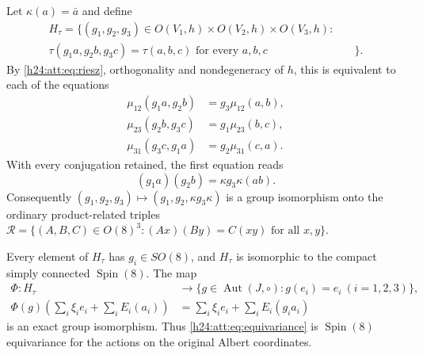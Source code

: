 Let $\kappa(a)=\bar a$ and define
\begin{equation}
\begin{split}
H_\tau=\{(g_1,g_2,g_3)\in O(V_1,h)\times O(V_2,h)\times O(V_3,h):\quad&\\
\tau(g_1a,g_2b,g_3c)=\tau(a,b,c)\text{ for every }a,b,c&\}.
\end{split}
\label{h24:att:eq:metric-stabilizer}
\end{equation}
By \eqref{h24:att:eq:riesz}, orthogonality and nondegeneracy of $h$,
this is equivalent to each of the equations
\begin{align}
 \mu_{12}(g_1a,g_2b)&=g_3\mu_{12}(a,b),\nonumber\\
 \mu_{23}(g_2b,g_3c)&=g_1\mu_{23}(b,c),\label{h24:att:eq:equivariance}\\
 \mu_{31}(g_3c,g_1a)&=g_2\mu_{31}(c,a).\nonumber
\end{align}
With every conjugation retained, the first equation reads
\begin{equation}
 (g_1a)(g_2b)=\kappa g_3\kappa(ab).
 \label{h24:att:eq:related-triple}
\end{equation}
Consequently $(g_1,g_2,g_3)\mapsto(g_1,g_2,\kappa g_3\kappa)$
is a group isomorphism onto the ordinary product-related triples
$\mathcal R=\{(A,B,C)\in O(8)^3:(Ax)(By)=C(xy)\text{ for all }x,y\}$.

\begin{theorem}\label{h24:att:thm:stabilizer}
Every element of $H_\tau$ has $g_i\in SO(8)$, and $H_\tau$ is
isomorphic to the compact simply connected $\operatorname{Spin}(8)$.
The map
\[
\begin{split}
 \Phi:H_\tau&\longrightarrow
 \{g\in\operatorname{Aut}(J,\circ):g(e_i)=e_i\ (i=1,2,3)\},\\
 \Phi(g)\left(\sum_i\xi_i e_i+\sum_iE_i(a_i)\right)
 &=\sum_i\xi_i e_i+\sum_iE_i(g_i a_i)
\end{split}
\]
is an exact group isomorphism. Thus \eqref{h24:att:eq:equivariance} is
$\operatorname{Spin}(8)$ equivariance for the actions on the original
Albert coordinates.
\end{theorem}

